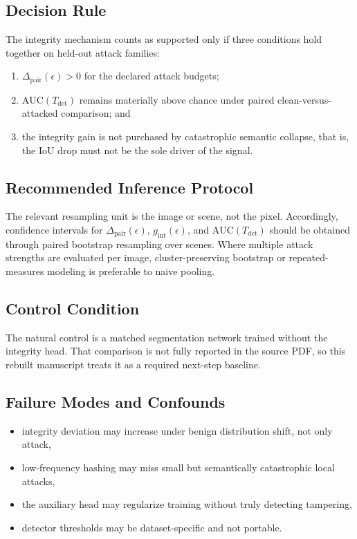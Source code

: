 \documentclass[11pt]{article}
\begin{document}
\subsection{Decision Rule}
The integrity mechanism counts as supported only if three conditions hold together on held-out attack families:
\begin{enumerate}[leftmargin=*]
\item $\Delta_{\mathrm{pair}}(\epsilon)>0$ for the declared attack budgets;
\item $\mathrm{AUC}(T_{\mathrm{det}})$ remains materially above chance under paired clean-versus-attacked comparison; and
\item the integrity gain is not purchased by catastrophic semantic collapse, that is, the IoU drop must not be the sole driver of the signal.
\end{enumerate}

\subsection{Recommended Inference Protocol}
The relevant resampling unit is the image or scene, not the pixel. Accordingly, confidence intervals for $\Delta_{\mathrm{pair}}(\epsilon)$, $g_{\mathrm{int}}(\epsilon)$, and $\mathrm{AUC}(T_{\mathrm{det}})$ should be obtained through paired bootstrap resampling over scenes. Where multiple attack strengths are evaluated per image, cluster-preserving bootstrap or repeated-measures modeling is preferable to naive pooling.

\subsection{Control Condition}
The natural control is a matched segmentation network trained without the integrity head. That comparison is not fully reported in the source PDF, so this rebuilt manuscript treats it as a required next-step baseline.

\subsection{Failure Modes and Confounds}
\begin{itemize}[leftmargin=*]
\item integrity deviation may increase under benign distribution shift, not only attack,
\item low-frequency hashing may miss small but semantically catastrophic local attacks,
\item the auxiliary head may regularize training without truly detecting tampering,
\item detector thresholds may be dataset-specific and not portable.
\end{itemize}
\end{document}
